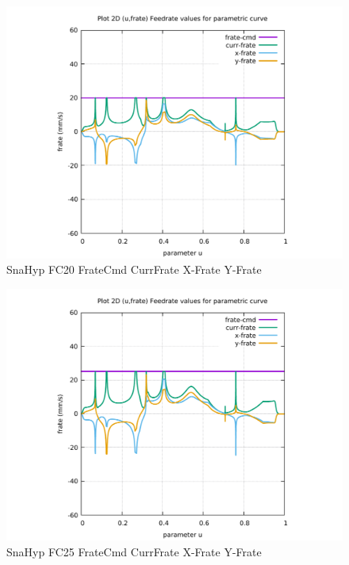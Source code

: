 \begin{figure}
	\caption     {SnaHyp FC20 FrateCmd CurrFrate X-Frate Y-Frate}
	\label{28-img-SnaHyp-FC20-FrateCmd-CurrFrate-X-Frate-Y-Frate.pdf}
\includegraphics[width=1.00\textwidth]{Chap4/appendix/app-SnaHyp/plots/28-img-SnaHyp-FC20-FrateCmd-CurrFrate-X-Frate-Y-Frate.pdf}
\end{figure}


\clearpage
\pagebreak

\begin{figure}
	\caption     {SnaHyp FC25 FrateCmd CurrFrate X-Frate Y-Frate}
	\label{29-img-SnaHyp-FC25-FrateCmd-CurrFrate-X-Frate-Y-Frate.pdf}
\includegraphics[width=1.00\textwidth]{Chap4/appendix/app-SnaHyp/plots/29-img-SnaHyp-FC30-FrateCmd-CurrFrate-X-Frate-Y-Frate.pdf}
\end{figure}


